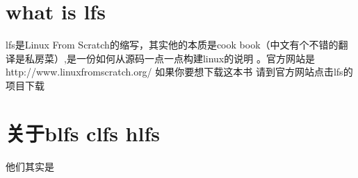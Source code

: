 \section{what is lfs}
lfs是Linux From Scratch的缩写，其实他的本质是cook book（中文有个不错的翻译是私房菜）,是一份如何从源码一点一点构建linux的说明
。官方网站是http://www.linuxfromscratch.org/ 如果你要想下载这本书 请到官方网站点击lfs的项目下载
\section{关于blfs clfs hlfs}
他们其实是
